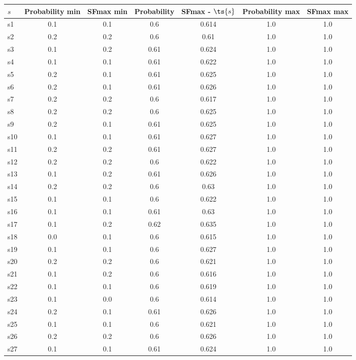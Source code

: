 \documentclass{article}
\begin{document}
\noindent\begin{tabular}{|l|c|c|c|c|c|c|}
\hline
$s$& Probability min & SFmax min & Probability & SFmax - $\ts{s}$ & Probability max & SFmax max\\
\hline
s1 &0.1 & 0.1 & 0.6 & 0.614 & 1.0 & 1.0\\
\hline
s2 &0.2 & 0.2 & 0.6 & 0.61 & 1.0 & 1.0\\
\hline
s3 &0.1 & 0.2 & 0.61 & 0.624 & 1.0 & 1.0\\
\hline
s4 &0.1 & 0.1 & 0.61 & 0.622 & 1.0 & 1.0\\
\hline
s5 &0.2 & 0.1 & 0.61 & 0.625 & 1.0 & 1.0\\
\hline
s6 &0.2 & 0.1 & 0.61 & 0.626 & 1.0 & 1.0\\
\hline
s7 &0.2 & 0.2 & 0.6 & 0.617 & 1.0 & 1.0\\
\hline
s8 &0.2 & 0.2 & 0.6 & 0.625 & 1.0 & 1.0\\
\hline
s9 &0.2 & 0.1 & 0.61 & 0.625 & 1.0 & 1.0\\
\hline
s10 &0.1 & 0.1 & 0.61 & 0.627 & 1.0 & 1.0\\
\hline
s11 &0.2 & 0.2 & 0.61 & 0.627 & 1.0 & 1.0\\
\hline
s12 &0.2 & 0.2 & 0.6 & 0.622 & 1.0 & 1.0\\
\hline
s13 &0.1 & 0.2 & 0.61 & 0.626 & 1.0 & 1.0\\
\hline
s14 &0.2 & 0.2 & 0.6 & 0.63 & 1.0 & 1.0\\
\hline
s15 &0.1 & 0.1 & 0.6 & 0.622 & 1.0 & 1.0\\
\hline
s16 &0.1 & 0.1 & 0.61 & 0.63 & 1.0 & 1.0\\
\hline
s17 &0.1 & 0.2 & 0.62 & 0.635 & 1.0 & 1.0\\
\hline
s18 &0.0 & 0.1 & 0.6 & 0.615 & 1.0 & 1.0\\
\hline
s19 &0.1 & 0.1 & 0.6 & 0.627 & 1.0 & 1.0\\
\hline
s20 &0.2 & 0.2 & 0.6 & 0.621 & 1.0 & 1.0\\
\hline
s21 &0.1 & 0.2 & 0.6 & 0.616 & 1.0 & 1.0\\
\hline
s22 &0.1 & 0.1 & 0.6 & 0.619 & 1.0 & 1.0\\
\hline
s23 &0.1 & 0.0 & 0.6 & 0.614 & 1.0 & 1.0\\
\hline
s24 &0.2 & 0.1 & 0.61 & 0.626 & 1.0 & 1.0\\
\hline
s25 &0.1 & 0.1 & 0.6 & 0.621 & 1.0 & 1.0\\
\hline
s26 &0.2 & 0.2 & 0.6 & 0.626 & 1.0 & 1.0\\
\hline
s27 &0.1 & 0.1 & 0.61 & 0.624 & 1.0 & 1.0\\

\end{tabular}
\end{document}
